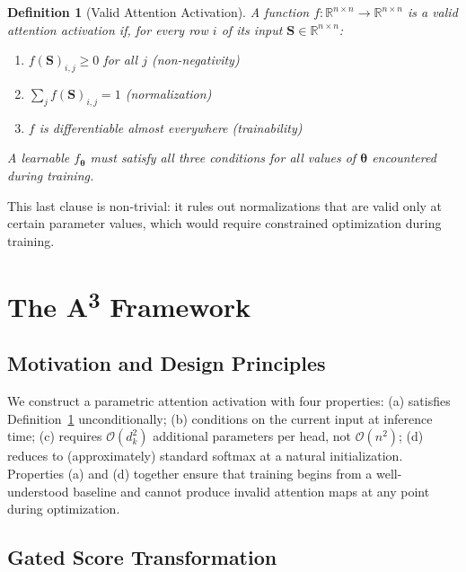 \documentclass[11pt]{article}
\newtheorem{definition}{Definition}
\newcommand{\AAA}{\textsc{A\textsuperscript{3}}}
\newcommand{\RR}{\mathbb{R}}
\newcommand{\btheta}{\boldsymbol{\theta}}
\newcommand{\bS}{\mathbf{S}}
\begin{document}
\begin{definition}[Valid Attention Activation]
\label{def:valid}
A function $f: \RR^{n\times n} \to \RR^{n\times n}$ is a valid attention activation if, for every row $i$ of its input $\bS \in \RR^{n\times n}$:
\begin{enumerate}
  \item $f(\bS)_{i,j} \geq 0$ for all $j$ \hfill (non-negativity)
  \item $\sum_j f(\bS)_{i,j} = 1$ \hfill (normalization)
  \item $f$ is differentiable almost everywhere \hfill (trainability)
\end{enumerate}
A \emph{learnable} $f_{\btheta}$ must satisfy all three conditions for all values of $\btheta$ encountered during training.
\end{definition}

This last clause is non-trivial: it rules out normalizations that are valid only at certain parameter values, which would require constrained optimization during training.

\section{The \AAA{} Framework}
\label{sec:method}

\subsection{Motivation and Design Principles}

We construct a parametric attention activation with four properties: (a) satisfies Definition~\ref{def:valid} unconditionally; (b) conditions on the current input at inference time; (c) requires $\mathcal{O}(d_k^2)$ additional parameters per head, not $\mathcal{O}(n^2)$; (d) reduces to (approximately) standard softmax at a natural initialization. Properties (a) and (d) together ensure that training begins from a well-understood baseline and cannot produce invalid attention maps at any point during optimization.

\subsection{Gated Score Transformation}
\end{document}
